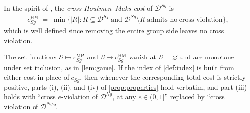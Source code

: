 \documentclass[11 pt]{article}
\begin{document}
\begin{definition}\label{def:app_hm}
In the spirit of \citet{houtman1985determining}, the \emph{cross Houtman--Maks cost} of $\mathcal{D}^{Sg}$ is
\begin{align*}
c^{\mathrm{HM}}_{Sg} \;=\; \min \bigl\{ |R| : R \subseteq \mathcal{D}^{Sg} \text{ and } \mathcal{D}^{Sg} \setminus R \text{ admits no cross violation} \bigr\},
\end{align*}
which is well defined since removing the entire group side leaves no cross violation.
\end{definition}

\begin{proposition}\label{prop:app_othermeasures}
The set functions $S \mapsto c^{\mathrm{MP}}_{Sg}$ and $S \mapsto c^{\mathrm{HM}}_{Sg}$ vanish at $S = \varnothing$ and are monotone under set inclusion, as in \autoref{lem:game}. If the index of \autoref{def:index} is built from either cost in place of $c_{Sg}$, then whenever the corresponding total cost is strictly positive, parts (i), (ii), and (iv) of \autoref{prop:properties} hold verbatim, and part (iii) holds with ``cross $e$-violation of $\mathcal{D}^{Ng}$, at any $e \in (0,1]$'' replaced by ``cross violation of $\mathcal{D}^{Ng}$''.
\end{proposition}
\end{document}
